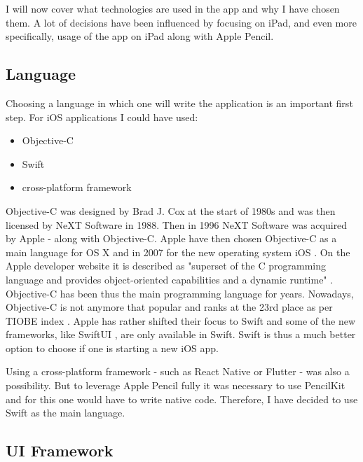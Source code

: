 I will now cover what technologies are used in the app and why I have chosen them. A lot of decisions have been influenced by focusing on iPad, and even more specifically, usage of the app on iPad along with Apple Pencil. 

\subsection{Language}

Choosing a language in which one will write the application is an important first step. For iOS applications I could have used:
\begin{itemize}
    \item Objective-C
    \item Swift
    \item cross-platform framework
\end{itemize}

Objective-C was designed by Brad J. Cox at the start of 1980s and was then licensed by NeXT Software in 1988. Then in 1996 NeXT Software was acquired by Apple - along with Objective-C. Apple have then chosen Objective-C as a main language for OS X and in 2007 for the new operating system iOS \cite{objective-c-programming}. On the Apple developer website it is described as "superset of the C programming language and provides object-oriented capabilities and a dynamic runtime" \cite{objective-c}. Objective-C has been thus the main programming language for years. Nowadays, Objective-C is not anymore that popular and ranks at the 23rd place as per TIOBE index \cite{tiobe-index}. Apple has rather shifted their focus to Swift and some of the new frameworks, like SwiftUI \cite{swiftui}, are only available in Swift. Swift is thus a much better option to choose if one is starting a new iOS app.

Using a cross-platform framework - such as React Native \cite{react-native} or Flutter \cite{flutter} - was also a possibility. But to leverage Apple Pencil fully it was necessary to use PencilKit \cite{pencilkit} and for this one would have to write native code. Therefore, I have decided to use Swift as the main language.

\subsection{UI Framework}

